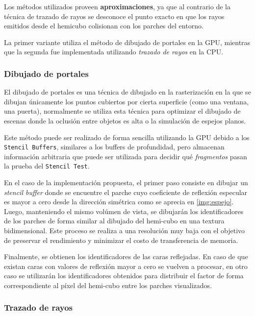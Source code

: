 Los métodos utilizados proveen \textbf{aproximaciones}, ya que al contrario de la técnica de trazado de rayos se desconoce el punto exacto en que los rayos emitidos desde el hemicubo colisionan con los parches del entorno.

La primer variante utiliza el método de dibujado de portales en la GPU, mientras que la segunda fue implementada utilizando \textit{trazado de rayos} en la CPU.

\subsubsection{Dibujado de portales}

El dibujado de portales es una técnica de dibujado en la rasterización en la que se dibujan únicamente los puntos cubiertos por cierta superficie (como una ventana, una puerta), normalmente se utiliza esta técnica para optimizar el dibujado de escenas donde la oclusión entre objetos es alta o la simulación de espejos planos.

Este método puede ser realizado de forma sencilla utilizando la GPU debido a los \verb|Stencil Buffers|, similares a los buffers de profundidad, pero almacenan información arbitraria que puede ser utilizada para decidir qué \textit{fragmentos} pasan la prueba del \verb|Stencil Test|.

En el caso de la implementación propuesta, el primer paso consiste en dibujar un \textit{stencil buffer} donde se encuentre el parche cuyo coeficiente de reflexión especular es mayor a cero desde la dirección simétrica como se aprecia en \ref{img:espejo}. Luego, manteniendo el mismo volúmen de vista, se dibujarán los identificadores de los parches de forma similar al dibujado del hemi-cubo en una textura bidimensional. Este proceso se realiza a una resolución muy baja con el objetivo de preservar el rendimiento y minimizar el costo de transferencia de memoria.

Finalmente, se obtienen los identificadores de las caras reflejadas. En caso de que existan caras con valores de reflexión mayor a cero se vuelven a procesar, en otro caso se utilizarán los identificadores obtenidos para distribuir el factor de forma correspondiente al píxel del hemi-cubo entre los parches visualizados.

\subsubsection{Trazado de rayos}

